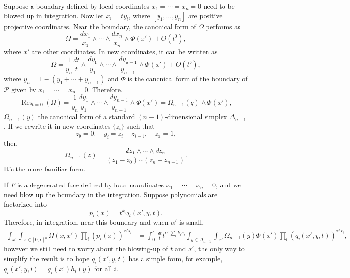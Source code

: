 \documentclass[12pt]{article}
\theoremstyle{definition}
\theoremstyle{plain}
\begin{document}
Suppose a boundary defined by local coordinates $x_1=\cdots=x_n=0$ need to be blowed up in integration. Now let $x_i=ty_i$, where $[y_1,\dots,y_n]$ are positive projective coordinates. Near the boundary, the canonical form of $\Omega$ performs as 
\[
	\Omega=\frac{dx_1}{x_1}\wedge \cdots\wedge\frac{dx_n}{x_n}
	\wedge \Phi(x')+O(t^0),
\]
where $x'$ are other coordinates. In new coordinates, it can be written as 
\[
	\Omega=\frac{1}{y_n}\frac{dt}{t}\wedge \frac{dy_1}{y_1}\wedge \cdots\wedge\frac{dy_{n-1}}{y_{n-1}}\wedge \Phi(x')+O(t^0),
\]
where $y_n=1-(y_1+\cdots+y_{n-1})$ and $\Phi$ is the canonical form of the boundary of $\mathcal P$ given by $x_1=\cdots=x_n=0$. Therefore,
\[
	\operatorname{Res}_{t=0}(\Omega)=\frac{1}{y_n}\frac{dy_1}{y_1}\wedge \cdots\wedge\frac{dy_{n-1}}{y_{n-1}}\wedge \Phi(x')=\Omega_{n-1}(y)\wedge \Phi(x'),
\]
$\Omega_{n-1}(y)$ the canonical form of a standard $(n-1)$-dimensional simplex $\Delta_{n-1}$. If we rewrite it in new coordinates $\{z_i\}$ such that
\[
	z_0=0,\quad y_i=z_i-z_{i-1},\quad z_{n}=1,
\]
then 
\[
	\Omega_{n-1}(z)=\frac{dz_1\wedge\cdots\wedge dz_n}{(z_1-z_0)\cdots (z_n-z_{n-1})}.
\]
It's the more familiar form.




If $F$ is a degenerated face defined by local coordinates $x_1=\cdots=x_n=0$, and we need blow up the boundary in the integration. Suppose polynomials are factorized into
\[
	p_i(x) = t^{k_i}q_i(x',y,t).
\]
Therefore, in integration, near this boundary and when $\alpha'$ is small, 
\[
	\begin{aligned}
		\int_{x'} \int_{x\in [0,\epsilon]^n} \Omega(x,x')\, \prod_i(p_i(x))^{\alpha' s_i}
		&=
		\int_0^\epsilon \, \frac{dt}{t} t^{\alpha' \sum_i k_is_i}\int_{y\in\Delta_{n-1}}\int_{x'}\Omega_{n-1}(y)
		\Phi(x')\prod_i
		(q_i(x',y,t))^{\alpha' s_i},
	\end{aligned}
\]
however we still need to worry about the blowing-up of $t$ and $x'$, the only way to simplify the result is to hope $q_i(x',y,t)$ has a simple form, for example, $q_i(x',y,t)=g_i(x')h_i(y)$ for all $i$.
\end{document}
